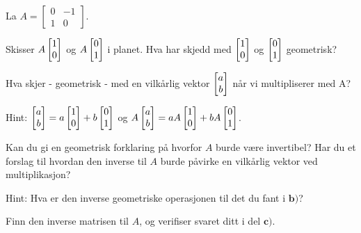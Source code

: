 \begin{oppgave}

La $A=\begin{bmatrix}
0 & -1\\
1 & 0
\end{bmatrix}.$

\begin{punkt}
Skisser $A\begin{bmatrix} 1 \\ 0 \end{bmatrix}$ og $A\begin{bmatrix} 0 \\ 1 \end{bmatrix}$ i planet. Hva har skjedd med $\begin{bmatrix} 1 \\ 0 \end{bmatrix}$ og $\begin{bmatrix} 0 \\ 1 \end{bmatrix}$ geometrisk?
\end{punkt}

\begin{punkt}
Hva skjer -  geometrisk - med en vilkårlig vektor $\begin{bmatrix} a \\ b \end{bmatrix}$ når vi multipliserer med A?

Hint: $\begin{bmatrix} a \\ b \end{bmatrix}=a\begin{bmatrix} 1 \\ 0 \end{bmatrix}+b\begin{bmatrix} 0 \\ 1 \end{bmatrix}$ og $A\begin{bmatrix} a \\ b \end{bmatrix}=aA\begin{bmatrix} 1 \\ 0 \end{bmatrix}+bA\begin{bmatrix} 0 \\ 1 \end{bmatrix}$.
\end{punkt}

\begin{punkt}
Kan du gi en geometrisk forklaring på hvorfor $A$ burde være invertibel? Har du et forslag til hvordan den inverse til $A$ burde påvirke en vilkårlig vektor ved multiplikasjon?

Hint: Hva er den inverse geometriske operasjonen til det du fant i $\textbf{b)}$?
\end{punkt}

\begin{punkt}
Finn den inverse matrisen til $A$, og verifiser svaret ditt i del $\textbf{c)}$.
\end{punkt}

\end{oppgave}

